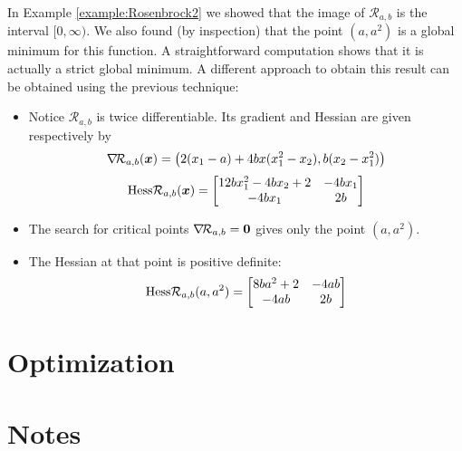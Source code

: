 \begin{example}
In Example \ref{example:Rosenbrock2} we showed that the image of $\mathcal{R}_{a,b}$ is the interval $[0,\infty)$.  We also found (by inspection) that the point $(a,a^2)$ is a global minimum for this function. A straightforward computation shows that it is actually a strict global minimum.  A different approach to obtain this result can be obtained using the previous technique:
\begin{itemize}
	\item Notice $\mathcal{R}_{a,b}$ is twice differentiable.  Its gradient and Hessian are given respectively by
	\begin{equation*}
	\mathop{\nabla\! {\mathcal{R}_{a,b}}}(\boldsymbol{x}) = \big( 2(x_1-a) +4bx(x_1^2-x_2) , b(x_2-x_1^2) \big) \\
	\end{equation*}
	\begin{equation*}
	\mathop{\mathrm{Hess}{\mathcal{R}_{a,b}}}(\boldsymbol{x}) = \begin{bmatrix}
	12bx_1^2-4bx_2+2 & -4bx_1 \\
	-4bx_1 & 2b
	\end{bmatrix}
	\end{equation*}
	\item The search for critical points $\mathop{\nabla\! {\mathcal{R}_{a,b}}} = \boldsymbol{0}$ gives only the point $(a,a^2)$.
	\item The Hessian at that point is positive definite:
	\begin{equation*}
	\mathop{\mathrm{Hess}{\mathcal{R}_{a,b}}}(a,a^2) = \begin{bmatrix}
	8ba^2+2 & -4ab \\
	-4ab & 2b
	\end{bmatrix}
	\end{equation*}
\end{itemize}
\end{example}

\section{Optimization}



\section*{Notes}
	